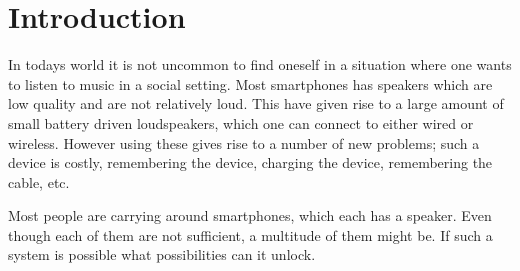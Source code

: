 \chapter{Introduction}\label{cha:introduction}
%
% 
%
%
%
%
%

In todays world it is not uncommon to find oneself in a situation where one wants to listen to music in a social setting.
Most smartphones has speakers which are low quality and are not relatively loud. 
This have given rise to a large amount of small battery driven loudspeakers, which one can connect to either wired or wireless.
However using these gives rise to a number of new problems; such a device is costly, remembering the device, charging the device, remembering the cable, etc.

Most people are carrying around smartphones, which each has a speaker.
Even though each of them are not sufficient, a multitude of them might be. 
If such a system is possible what possibilities can it unlock. 
